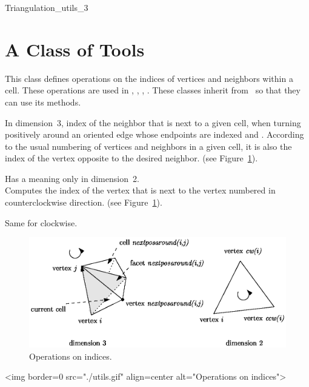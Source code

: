 \clearpage

\begin{ccClass}{Triangulation_utils_3}
\section{A Class of Tools \protect{}} 
\label{Triangulation3-sec-class-Utils}

This class defines operations on the indices of vertices and neighbors 
within a cell. These operations are used in ,
,
,
. These classes inherit from
\ccClassName\ so that they can use its methods.


{In dimension~3, index of the neighbor that is next to a given cell,
when turning positively around an oriented edge whose endpoints are
indexed  and . According to the usual numbering of
vertices and neighbors in a given cell, it is also the index of the vertex 
opposite to the desired neighbor. (see Figure~\ref{Triangulation3-fig-utils}).
}

{Has a meaning only in dimension~2.\\
 Computes the index of the vertex that is next to the vertex numbered
 in counterclockwise direction. (see
Figure~\ref{Triangulation3-fig-utils}).  
}

{Same for clockwise.}

\begin{ccTexOnly}
\begin{figure}[htbp]
\begin{center} 
\includegraphics{utils.eps} 
\end{center}
\caption{Operations on indices.\label{Triangulation3-fig-utils}}
\end{figure} 
\end{ccTexOnly}

\begin{ccHtmlOnly}
<img border=0 src="./utils.gif" align=center alt="Operations on indices">
\end{ccHtmlOnly}

\end{ccClass}

